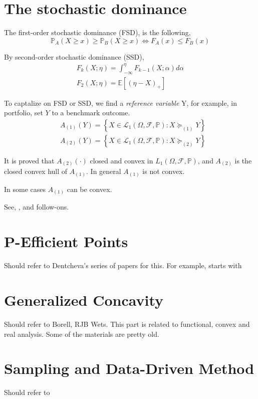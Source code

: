 \documentclass[a4pper,11pt]{article}
\newcommand{\pr}{\mathbb P}
\begin{document}
\section{The stochastic dominance}

The first-order stochastic dominance (FSD), is the following,
\[\pr_A (X \ge x) \ge \pr_B(X\ge x) \Leftrightarrow F_A(x) \le F_B(x)\]

By second-order stochastic dominance (SSD),
\begin{align}
    F_{k}(X ; \eta)=\int_{-\infty}^{\eta} F_{k-1}(X ; \alpha) d \alpha \\
    F_{2}(X ; \eta)=\mathbb{E}\left[(\eta-X)_{+}\right]
\end{align}

To captalize on FSD or SSD,  we find a \emph{reference variable} Y, for example, in portfolio, set \(Y\) to a benchmark outcome.
\begin{align}
     & A_{(1)}(Y)=\left\{X \in \mathcal L_{1}(\Omega, \mathcal F , \pr ): X \succeq_{(1)} Y\right\} \\
     & A_{(2)}(Y)=\left\{X \in \mathcal L_{1}(\Omega, \mathcal F , \pr ): X \succeq_{(2)} Y\right\}
\end{align}

It is proved that \(A_{(2)}(\cdot)\) closed and convex in \(L _{1}(\Omega, \mathcal F, \pr )\), and \(A_{(2)}\) is the closed convex hull of \(A_{(1)}\). In general \(A_{(1)}\) is not convex.

In some cases \(A_{(1)}\) can be convex.

See, \cite{dentcheva_optimization_2003}, and follow-ons.

\section{P-Efficient Points}

Should refer to Dentcheva's series of papers for this. For example, starts with \cite{dentcheva_concavity_2000}

\section{Generalized Concavity}
Should refer to Borell, RJB Wets. This part is related to functional, convex and real analysis. Some of the materials are pretty old.

\section{Sampling and Data-Driven Method}
Should refer to \cite{nemirovski_convex_2007}



\end{document}
